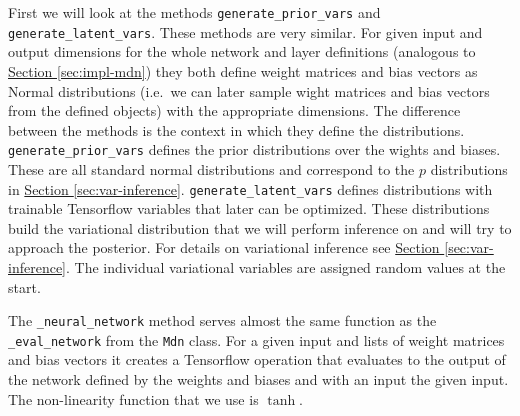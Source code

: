 \documentclass[12pt,a4paper,twoside]{scrartcl}
\numberwithin{equation}{section}
\newcommand{\refsec}[1]{\hyperref[#1]{Section \ref*{#1}}}
\begin{document}
First we will look at the methods \texttt{generate\_prior\_vars} and \texttt{generate\_latent\_vars}. These methods are very similar. For given input and output dimensions for the whole network and layer definitions (analogous to \refsec{sec:impl-mdn}) they both define weight matrices and bias vectors as Normal distributions (i.e.\ we can later sample wight matrices and bias vectors from the defined objects) with the appropriate dimensions. The difference between the methods is the context in which they define the distributions. \texttt{generate\_prior\_vars} defines the prior distributions over the wights and biases. These are all standard normal distributions and correspond to the \(p\) distributions in \refsec{sec:var-inference}. \texttt{generate\_latent\_vars} defines distributions with trainable Tensorflow variables that later can be optimized. These distributions build the variational distribution that we will perform inference on and will try to approach the posterior. For details on variational inference see \refsec{sec:var-inference}. The individual variational variables are assigned random values at the start.

The \texttt{\_neural\_network} method serves almost the same function as the \texttt{\_eval\_network} from the \texttt{Mdn} class. For a given input and lists of weight matrices and bias vectors it creates a Tensorflow operation that evaluates to the output of the network defined by the weights and biases and with an input the given input. The non-linearity function that we use is \(\tanh\). 
\end{document}
